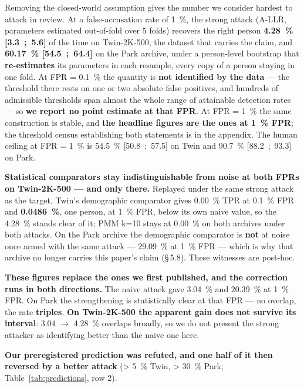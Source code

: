 \documentclass[sigconf,anonymous,review]{acmart}
\begin{document}
Removing the closed-world assumption gives the number we consider hardest to attack in review. At a false-accusation rate of 1~\%, the strong attack (A-LLR, parameters estimated out-of-fold over 5 folds) recovers the right person \textbf{4.28~\% [3.3~;~5.6]} of the time on Twin-2K-500, the dataset that carries the claim, and \textbf{60.17~\% [54.5~;~64.4]} on the Park archive, under a person-level bootstrap that \textbf{re-estimates} its parameters in each resample, every copy of a person staying in one fold. At FPR = 0.1~\% the quantity is \textbf{not identified by the data} --- the threshold there rests on one or two absolute false positives, and hundreds of admissible thresholds span almost the whole range of attainable detection rates --- so \textbf{we report no point estimate at that FPR}. At FPR = 1~\% the same construction is stable, and \textbf{the headline figures are the ones at 1~\% FPR}; the threshold census establishing both statements is in the appendix. The human ceiling at FPR = 1~\% is 54.5~\% [50.8~;~57.5] on Twin and 90.7~\% [88.2~;~93.3] on Park.

\textbf{Statistical comparators stay indistinguishable from noise at both FPRs on Twin-2K-500 --- and only there.} Replayed under the same strong attack as the target, Twin's demographic comparator gives 0.00~\% TPR at 0.1~\% FPR and \textbf{0.0486~\%}, one person, at 1~\% FPR, below its own naive value, so the 4.28~\% stands clear of it; PMM k=10 stays at 0.00~\% on both archives under both attacks. On the Park archive the demographic comparator is \textbf{not} at noise once armed with the same attack --- 29.09~\% at 1~\% FPR --- which is why that archive no longer carries this paper's claim (\S\,5.8). These witnesses are post-hoc.

\textbf{These figures replace the ones we first published, and the correction runs in both directions.} The naive attack gave 3.04~\% and 20.39~\% at 1~\% FPR. On Park the strengthening is statistically clear at that FPR --- no overlap, the rate \textbf{triples}. \textbf{On Twin-2K-500 the apparent gain does not survive its interval}: 3.04 $\rightarrow$ 4.28~\% overlaps broadly, so we do not present the strong attacker as identifying better than the naive one here.

\textbf{Our preregistered prediction was refuted, and one half of it then reversed by a better attack} (> 5~\% Twin, > 30~\% Park; Table~\ref{tab:predictions}, row 2).
\end{document}
